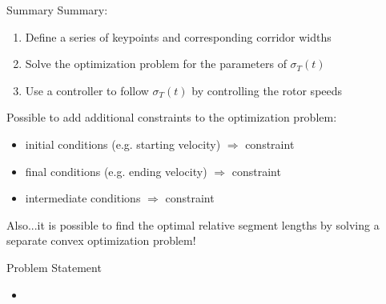 \documentclass[onlymath]{beamer}
\begin{document}
\begin{frame}{Summary}
    Summary:
    \begin{enumerate}
    \item Define a series of keypoints and corresponding corridor widths
    \item Solve the optimization problem for the parameters of $\sigma_T(t)$
    \item Use a controller to follow $\sigma_T(t)$ by controlling the rotor speeds
    \end{enumerate}
    \vspace{1em}
    Possible to add additional constraints to the optimization problem:
    \begin{itemize}
    \item initial conditions (e.g. starting velocity) $\Rightarrow$ constraint
    \item final conditions (e.g. ending velocity) $\Rightarrow$ constraint
    \item intermediate conditions $\Rightarrow$ constraint
    \end{itemize}
    \vspace{1em}
    Also...it is possible to find the optimal relative segment lengths by
    solving a separate convex optimization problem!
\end{frame}

\begin{frame}
\end{frame}

\begin{frame}{Problem Statement}
    \begin{itemize}
    \item 
    \end{itemize}
\end{frame}
\end{document}
